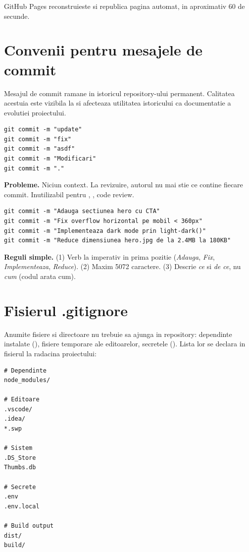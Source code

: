 GitHub Pages reconstruieste si republica pagina automat, in aproximativ 60 de secunde.

\section{Convenii pentru mesajele de commit}

Mesajul de commit ramane in istoricul repository-ului permanent. Calitatea acestuia este vizibila la  si afecteaza utilitatea istoricului ca documentatie a evolutiei proiectului.

\begin{dano}[Asa nu]
\begin{lstlisting}[style=bash, numbers=none]
git commit -m "update"
git commit -m "fix"
git commit -m "asdf"
git commit -m "Modificari"
git commit -m "."
\end{lstlisting}
\textbf{Probleme.} Niciun context. La revizuire, autorul nu mai stie ce contine fiecare commit. Inutilizabil pentru , , code review.
\end{dano}

\begin{dado}[Asa da]
\begin{lstlisting}[style=bash, numbers=none]
git commit -m "Adauga sectiunea hero cu CTA"
git commit -m "Fix overflow horizontal pe mobil < 360px"
git commit -m "Implementeaza dark mode prin light-dark()"
git commit -m "Reduce dimensiunea hero.jpg de la 2.4MB la 180KB"
\end{lstlisting}
\textbf{Reguli simple.} (1) Verb la imperativ in prima pozitie (\emph{Adauga}, \emph{Fix}, \emph{Implementeaza}, \emph{Reduce}). (2) Maxim 50\textendash{}72 caractere. (3) Descrie \emph{ce} si \emph{de ce}, nu \emph{cum} (codul arata cum).
\end{dado}

\section{Fisierul .gitignore}

Anumite fisiere si directoare nu trebuie sa ajunga in repository: dependinte instalate (), fisiere temporare ale editoarelor, secretele (). Lista lor se declara in fisierul  la radacina proiectului:

\begin{lstlisting}[style=bash, caption={Exemplu minimal pentru proiect web static}]
# Dependinte
node_modules/

# Editoare
.vscode/
.idea/
*.swp

# Sistem
.DS_Store
Thumbs.db

# Secrete
.env
.env.local

# Build output
dist/
build/
\end{lstlisting}

